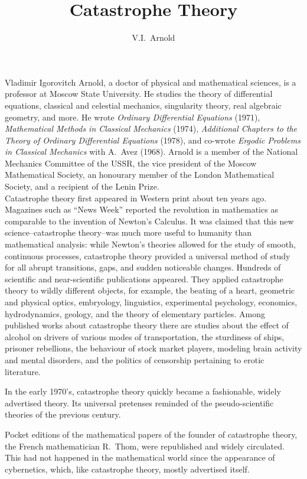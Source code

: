\documentclass[12pt]{amsart}
\title{Catastrophe Theory}
\author{V.I.~Arnold}
\begin{document}
\maketitle
{\fontsize{9pt}{1em}\selectfont
Vladimir Igorovitch Arnold, a doctor of physical and mathematical sciences, is a
professor at Moscow State University.
He studies the theory of differential equations, classical and celestial
mechanics, singularity theory, real algebraic geometry, and more.
He wrote \textit{Ordinary Differential Equations} (1971), \textit{Mathematical
Methods in Classical Mechanics} (1974), \textit{Additional Chapters to the
Theory of Ordinary Differential Equations} (1978), and co-wrote \textit{Ergodic
Problems in Classical Mechanics} with A.~Avez (1968).
Arnold is a member of the National Mechanics Committee of the USSR, the vice
president of the Moscow Mathematical Society, an honourary member of the London
Mathematical Society, and a recipient of the Lenin Prize.}\\

Catastrophe theory first appeared in Western print about ten years ago.
Magazines such as ``News Week'' reported the revolution in mathematics as
comparable to the invention of Newton's Calculus.
It was claimed that this new science--catastrophe theory--was much more
useful to humanity than mathematical analysis: while Newton's theories allowed
for the study of smooth, continuous processes, catastrophe theory provided a
universal method of study for all abrupt transitions, gaps, and sudden
noticeable changes.
Hundreds of scientific and near-scientific publications appeared.
They applied catastrophe theory to wildly different objects, for example, the
beating of a heart, geometric and physical optics, embryology, linguistics,
experimental psychology, economics, hydrodynamics, geology, and the theory of
elementary particles.
Among published works about catastrophe theory there are studies about the
effect of alcohol on drivers of various modes of transportation, the sturdiness
of ships, prisoner rebellions, the behaviour of stock market players, modeling
brain activity and mental disorders, and the politics of censorship pertaining
to erotic literature.

In the early 1970's, catastrophe theory quickly became a fashionable, widely
advertised theory.
Its universal pretenses reminded of the pseudo-scientific theories of the
previous century.

Pocket editions of the mathematical papers of the founder of catastrophe theory,
the French mathematician R.~Thom, were republished and widely circulated.
This had not happened in the mathematical world since the appearance of
cybernetics, which, like catastrophe theory, mostly advertised itself.
\end{document}

